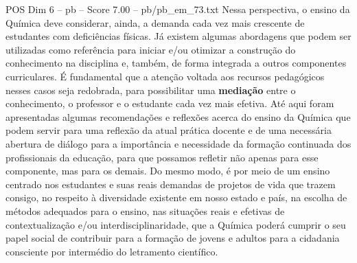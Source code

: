 \begin{textsample}{POS Dim 6 – pb – Score 7.00 – pb/pb\_em\_73.txt}
Nessa perspectiva, o ensino da Química deve considerar, ainda, a demanda cada vez mais crescente de estudantes com deficiências físicas.
Já existem algumas abordagens que podem ser utilizadas como referência para iniciar e/ou otimizar a construção do conhecimento na disciplina e, também, de forma integrada a outros componentes curriculares.
É fundamental que a atenção voltada aos recursos pedagógicos nesses casos seja redobrada, para possibilitar uma \textbf{mediação} entre o conhecimento, o professor e o estudante cada vez mais efetiva.
Até aqui foram apresentadas algumas recomendações e reflexões acerca do ensino da Química que podem servir para uma reflexão da atual prática docente e de uma necessária abertura de diálogo para a importância e necessidade da formação continuada dos profissionais da educação, para que possamos refletir não apenas para esse componente, mas para os demais.
Do mesmo modo, é por meio de um ensino centrado nos estudantes e suas reais demandas de projetos de vida que trazem consigo, no respeito à diversidade existente em nosso estado e país, na escolha de métodos adequados para o ensino, nas situações reais e efetivas de contextualização e/ou interdisciplinaridade, que a Química poderá cumprir o seu papel social de contribuir para a formação de jovens e adultos para a cidadania consciente por intermédio do letramento científico.

\end{textsample}
